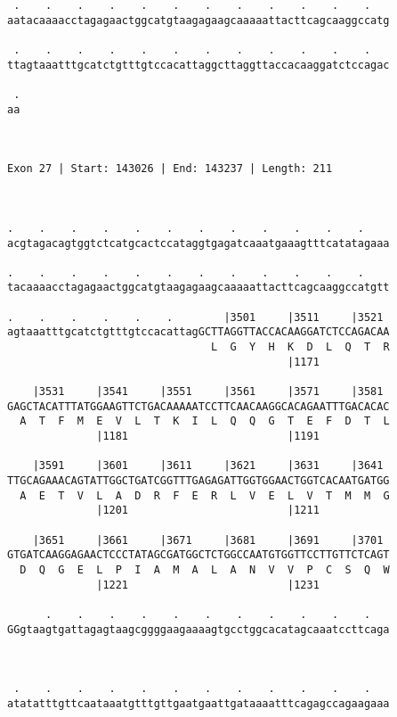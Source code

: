 \documentclass{article}
\begin{document}
\begin{Verbatim}
 .    .    .    .    .    .    .    .    .    .    .    .   
aatacaaaacctagagaactggcatgtaagagaagcaaaaattacttcagcaaggccatg
                                                            
 .    .    .    .    .    .    .    .    .    .    .    .   
ttagtaaatttgcatctgtttgtccacattaggcttaggttaccacaaggatctccagac
                                                            
 .
aa
  
  
 
Exon 27 | Start: 143026 | End: 143237 | Length: 211



.    .    .    .    .    .    .    .    .    .    .    .    
acgtagacagtggtctcatgcactccataggtgagatcaaatgaaagtttcatatagaaa
                                                            
.    .    .    .    .    .    .    .    .    .    .    .    
tacaaaacctagagaactggcatgtaagagaagcaaaaattacttcagcaaggccatgtt
                                                            
.    .    .    .    .    .        |3501     |3511     |3521 
agtaaatttgcatctgtttgtccacattagGCTTAGGTTACCACAAGGATCTCCAGACAA
                                L  G  Y  H  K  D  L  Q  T  R
                                            |1171           
  
    |3531     |3541     |3551     |3561     |3571     |3581 
GAGCTACATTTATGGAAGTTCTGACAAAAATCCTTCAACAAGGCACAGAATTTGACACAC
  A  T  F  M  E  V  L  T  K  I  L  Q  Q  G  T  E  F  D  T  L
              |1181                         |1191           
  
    |3591     |3601     |3611     |3621     |3631     |3641 
TTGCAGAAACAGTATTGGCTGATCGGTTTGAGAGATTGGTGGAACTGGTCACAATGATGG
  A  E  T  V  L  A  D  R  F  E  R  L  V  E  L  V  T  M  M  G
              |1201                         |1211           
  
    |3651     |3661     |3671     |3681     |3691     |3701 
GTGATCAAGGAGAACTCCCTATAGCGATGGCTCTGGCCAATGTGGTTCCTTGTTCTCAGT
  D  Q  G  E  L  P  I  A  M  A  L  A  N  V  V  P  C  S  Q  W
              |1221                         |1231           
  
      .    .    .    .    .    .    .    .    .    .    .   
GGgtaagtgattagagtaagcggggaagaaaagtgcctggcacatagcaaatccttcaga
                                                            
                                                            
  
 .    .    .    .    .    .    .    .    .    .    .    .   
atatatttgttcaataaatgtttgttgaatgaattgataaaatttcagagccagaagaaa
                                                            

\end{Verbatim}
\end{document}
